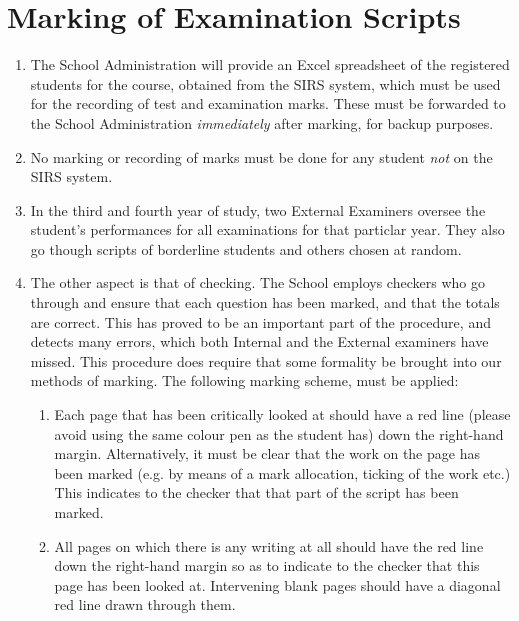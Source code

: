 \documentclass{ArcHandout}
\begin{document}
\section{Marking of Examination Scripts}
\begin{enumerate}

  \item The School Administration will provide an Excel spreadsheet of the
  registered students for the course, obtained from the SIRS system, which
  must be used for the recording of test and examination marks. These must
  be forwarded to the School Administration \emph{immediately} after
  marking, for backup purposes.

  \item No marking or recording of marks must be done for any student
  \emph{not} on the SIRS system.

  \item In the third and fourth year of study, two External Examiners
  oversee the student's performances for all examinations for that
  particlar year. They also go though scripts of borderline students and
  others chosen at random.

  \item The other aspect is that of checking. The School employs checkers
  who go through and ensure that each question has been marked, and that
  the totals are correct. This has proved to be an important part of the
  procedure, and detects many errors, which both Internal and the External
  examiners have missed. This procedure does require that some formality be
  brought into our methods of marking.  The following marking scheme, must
  be applied:

  \begin{enumerate}
    \item Each page that has been critically looked at should have a red
    line (please avoid using the same colour pen as the student has) down
    the right-hand margin. Alternatively, it must be clear that the work on
    the page has been marked (e.g. by means of a mark allocation, ticking
    of the work etc.) This indicates to the checker that that part of the
    script has been marked.

    \item All pages on which there is any writing at all should have the
    red line down the right-hand margin so as to indicate to the checker
    that this page has been looked at. Intervening blank pages should have
    a diagonal red line drawn through them.


\end{enumerate}
\end{enumerate}
\end{document}
